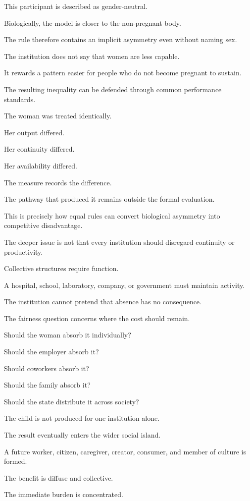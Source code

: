 This participant is described as gender-neutral.

Biologically, the model is closer to the non-pregnant body.

The rule therefore contains an implicit asymmetry even without naming sex.

The institution does not say that women are less capable.

It rewards a pattern easier for people who do not become pregnant to sustain.

The resulting inequality can be defended through common performance standards.

The woman was treated identically.

Her output differed.

Her continuity differed.

Her availability differed.

The measure records the difference.

The pathway that produced it remains outside the formal evaluation.

This is precisely how equal rules can convert biological asymmetry into competitive disadvantage.

The deeper issue is not that every institution should disregard continuity or productivity.

Collective structures require function.

A hospital, school, laboratory, company, or government must maintain activity.

The institution cannot pretend that absence has no consequence.

The fairness question concerns where the cost should remain.

Should the woman absorb it individually?

Should the employer absorb it?

Should coworkers absorb it?

Should the family absorb it?

Should the state distribute it across society?

The child is not produced for one institution alone.

The result eventually enters the wider social island.

A future worker, citizen, caregiver, creator, consumer, and member of culture is formed.

The benefit is diffuse and collective.

The immediate burden is concentrated.

